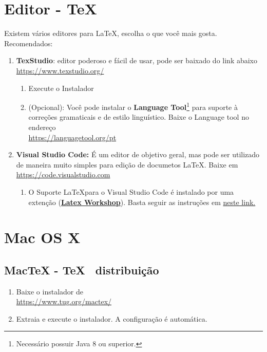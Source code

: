 \section*{Editor - \TeX~ }
Existem vários editores para \LaTeX, escolha o que você mais gosta. Recomendados:
\begin{enumerate}
	\item \textbf{TexStudio}: editor poderoso e fácil de usar, pode ser baixado do link abaixo\\
	      \href{https://www.texstudio.org/}{https://www.texstudio.org/}
        \begin{enumerate}
            \item	Execute o Instalador
	        \item (Opcional): Você pode instalar o \textbf{Language Tool}\footnote{Necessário possuir Java 8 ou superior.} para suporte à correções gramaticais e de estilo linguístico. Baixe o Language tool no endereço \\
            \href{https://languagetool.org/pt}{https://languagetool.org/pt}
        \end{enumerate}

    \item \textbf{Visual Studio Code:} É um editor de objetivo geral, mas pode ser utilizado de maneira muito simples para edição de documetos \LaTeX. Baixe em \\
    \href{https://code.visualstudio.com}{https://code.visualstudio.com}

    \begin{enumerate}
        \item O Suporte \LaTeX para o Visual Studio Code é instalado por uma extenção (\href{https://marketplace.visualstudio.com/items?itemName=James-Yu.latex-workshop}{\textbf{Latex Workshop}}). Basta seguir as instruções em \href{https://marketplace.visualstudio.com/items?itemName=James-Yu.latex-workshop}{neste link.}
    \end{enumerate}


\end{enumerate}

\section*{Mac OS X}
\subsection*{MacTeX - \TeX~ distribuição}
\begin{enumerate}
	\item	Baixe o instalador de\\
	      \href{https://www.tug.org/mactex/}{https://www.tug.org/mactex/}
	\item	Extraia e execute o instalador. A configuração é automática.
\end{enumerate}

